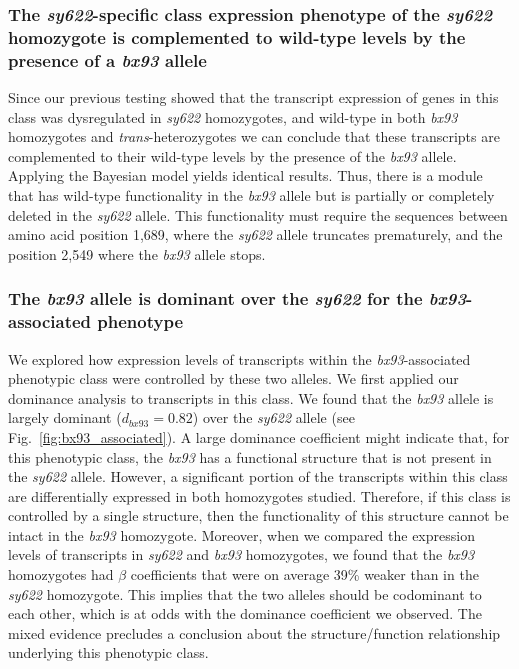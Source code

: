 \documentclass[10pt, twocolumn]{article}
\begin{document}
\subsubsection*{The \emph{sy622}-specific class expression phenotype of the
                \emph{sy622} homozygote is complemented to wild-type levels by
                the presence of a \emph{bx93} allele}
Since our previous testing showed that the transcript expression of genes in
this class was dysregulated in \emph{sy622} homozygotes, and wild-type in both
\emph{bx93} homozygotes and \emph{trans}-heterozygotes we can conclude that
these transcripts are complemented to their wild-type levels by the presence of
the \emph{bx93} allele. Applying the Bayesian model yields identical results.
Thus, there is a module that has wild-type functionality in the \emph{bx93}
allele but is partially or completely deleted in the \emph{sy622} allele. This
functionality must require the sequences between amino acid position 1,689, where
the \emph{sy622} allele truncates prematurely, and the position 2,549 where the
\emph{bx93} allele stops.

\subsubsection*{The \emph{bx93} allele is dominant over the \emph{sy622} for the
                \emph{bx93}-associated phenotype}
We explored how expression levels of transcripts within the
\emph{bx93}-associated phenotypic class were controlled by these two alleles. We
first applied our dominance analysis to transcripts in this class. We found that
the \emph{bx93} allele is largely dominant ($d_{bx93}=0.82$) over the
\emph{sy622} allele (see Fig.~\ref{fig:bx93_associated}). A large dominance
coefficient might indicate that, for this phenotypic class, the \emph{bx93} has
a functional structure that is not present in the \emph{sy622} allele. However,
a significant portion of the transcripts within this class are differentially
expressed in both homozygotes studied. Therefore, if this class is controlled by
a single structure, then the functionality of this structure cannot be intact in
the \emph{bx93} homozygote. Moreover, when we compared the expression levels of
transcripts in \emph{sy622} and \emph{bx93} homozygotes, we found that the
\emph{bx93} homozygotes had $\beta$ coefficients that were on average 39\%
weaker than in the \emph{sy622} homozygote. This implies that the two alleles
should be codominant to each other, which is at odds with the dominance
coefficient we observed. The mixed evidence precludes a conclusion about the
structure/function relationship underlying this phenotypic class.
\end{document}
